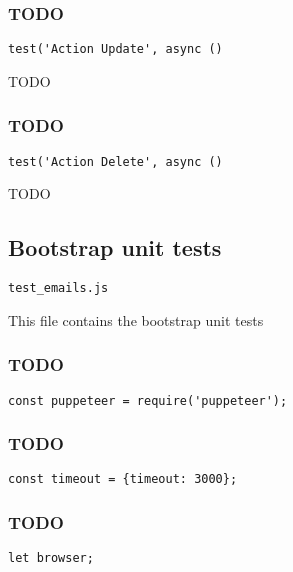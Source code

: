 \documentclass[a4paper]{article}
\begin{document}
\hypertarget{toc565}{}
\subsubsection{TODO}

\begin{lstlisting}
test('Action Update', async ()
\end{lstlisting}

TODO

\hypertarget{toc566}{}
\subsubsection{TODO}

\begin{lstlisting}
test('Action Delete', async ()
\end{lstlisting}

TODO

\hypertarget{toc567}{}
\subsection{Bootstrap unit tests}

\begin{lstlisting}
test_emails.js
\end{lstlisting}

This file contains the bootstrap unit tests

\hypertarget{toc568}{}
\subsubsection{TODO}

\begin{lstlisting}
const puppeteer = require('puppeteer');
\end{lstlisting}

\hypertarget{toc569}{}
\subsubsection{TODO}

\begin{lstlisting}
const timeout = {timeout: 3000};
\end{lstlisting}

\hypertarget{toc570}{}
\subsubsection{TODO}

\begin{lstlisting}
let browser;
\end{lstlisting}
\end{document}
